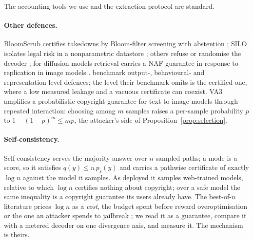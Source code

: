 The accounting tools we use
\citep{feldman2020renyifilter,whitehouse2023fully,rogers2016odometers,loynes1962stability,cruz1991calculus}
and the extraction protocol \citep{carlini2021extracting,carlini2023quantifying,cooper2025extracting} are
standard.

\paragraph{Other defences.}
BloomScrub certifies takedowns by Bloom-filter screening with abstention \citep{zhang2025bloomscrub}; SILO
isolates legal risk in a nonparametric datastore \citep{min2024silo}; others refuse \citep{liu2024shield} or
randomise the decoder \citep{chen2024randomization}; for diffusion models retrieval carries a NAF guarantee
\citep{golatkar2024cpr} in response to replication in image models \citep{somepalli2023diffusion}.
\citet{alshehyari2026copyshield} benchmark output-, behavioural- and representation-level defences; the level
their benchmark omits is the certified one, where a low measured leakage and a vacuous certificate can
coexist. VA3 \citep{li2024va3} amplifies a probabilistic copyright guarantee for text-to-image models through
repeated interaction: choosing among $m$ samples raises a per-sample probability $p$ to $1-(1-p)^m \le mp$,
the attacker's side of Proposition~\ref{prop:selection}.

\paragraph{Self-consistency.}
Self-consistency \citep{wang2023selfconsistency} serves the majority answer over $n$ sampled paths; a mode
is a score, so it satisfies $q(y) \le n\,p_s(y)$ and carries a pathwise certificate of exactly $\log n$
against the model it samples. As deployed it samples web-trained models, relative to which $\log n$
certifies nothing about copyright; over a safe model the same inequality is a copyright guarantee its users
already have. The best-of-$n$ literature prices $\log n$ as a \emph{cost}, the budget spent before reward
overoptimisation \citep{gao2023scaling,beirami2025bestofn} or the one an attacker spends to jailbreak
\citep{hughes2024bestofn}; we read it as a guarantee, compare it with a metered decoder on one divergence
axis, and measure it. The mechanism is theirs.
